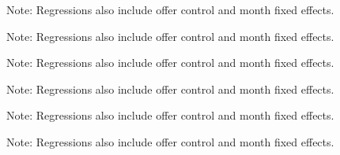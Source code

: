 \documentclass[12pt]{article}
\begin{document}
\begin{landscape}

\noindent Note: Regressions also include offer control and month fixed effects.
\end{landscape}

\begin{landscape}

\noindent Note: Regressions also include offer control and month fixed effects.
\end{landscape}

\begin{landscape}

\noindent Note: Regressions also include offer control and month fixed effects.
\end{landscape}

\begin{landscape}

\noindent Note: Regressions also include offer control and month fixed effects.
\end{landscape}

\begin{landscape}

\noindent Note: Regressions also include offer control and month fixed effects.
\end{landscape}

\begin{landscape}

\noindent Note: Regressions also include offer control and month fixed effects.
\end{landscape}
\end{document}
